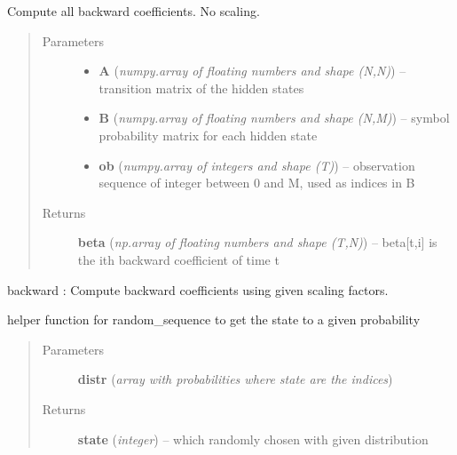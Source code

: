 \documentclass[letterpaper,10pt,english]{sphinxmanual}
\begin{document}
\begin{fulllineitems}
\label{hmm:kernel.python.backward_no_scaling}
Compute all backward coefficients. No scaling.
\begin{quote}\begin{description}
\item[{Parameters}] \leavevmode\begin{itemize}
\item {} 
\textbf{A} (\emph{numpy.array of floating numbers and shape (N,N)}) --
transition matrix of the hidden states

\item {} 
\textbf{B} (\emph{numpy.array of floating numbers and shape (N,M)}) --
symbol probability matrix for each hidden state

\item {} 
\textbf{ob} (\emph{numpy.array of integers and shape (T)}) --
observation sequence of integer between 0 and M, used as indices in B

\end{itemize}

\item[{Returns}] \leavevmode
\textbf{beta} (\emph{np.array of floating numbers and shape (T,N)}) --
beta{[}t,i{]} is the ith backward coefficient of time t

\end{description}\end{quote}




backward : Compute backward coefficients using given scaling factors.



\end{fulllineitems}


\begin{fulllineitems}
\label{hmm:kernel.python.draw_state}
helper function for random\_sequence to get the state to a given probability
\begin{quote}\begin{description}
\item[{Parameters}] \leavevmode
\textbf{distr} (\emph{array with probabilities where state are the indices})

\item[{Returns}] \leavevmode
\textbf{state} (\emph{integer}) --
which randomly chosen with given distribution

\end{description}\end{quote}

\end{fulllineitems}
\end{document}
